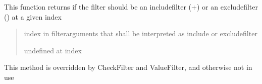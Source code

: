 \documentclass[a4paper,10pt,english]{sphinxmanual}
\begin{document}
\begin{fulllineitems}
\begin{fulllineitems}
\begin{quote}
\begin{description}
\begin{itemize}
\end{itemize}

\end{description}\end{quote}

\end{fulllineitems}


\begin{fulllineitems}
\label{\detokenize{fagus.filters:fagus.filters.FilBase.included}}
\pysigstartsignatures
{}
\pysigstopsignatures
\sphinxAtStartPar
This function returns if the filter should be an include\sphinxhyphen{}filter (+) or an exclude\sphinxhyphen{}filter (\sphinxhyphen{}) at a given index
\begin{quote}\begin{description}
\sphinxAtStartPar
{} \textendash{} index in filter\sphinxhyphen{}arguments that shall be interpreted as include\sphinxhyphen{} or exclude\sphinxhyphen{}filter

\sphinxAtStartPar
\begin{description}
\sphinxAtStartPar
undefined at index

\end{description}


\end{description}\end{quote}

\end{fulllineitems}


\begin{fulllineitems}
\label{\detokenize{fagus.filters:fagus.filters.FilBase.match_node}}
\pysigstartsignatures
{}
\pysigstopsignatures
\sphinxAtStartPar
This method is overridden by CheckFilter and ValueFilter, and otherwise not in use


\end{fulllineitems}
\end{fulllineitems}
\end{document}
